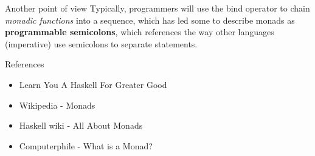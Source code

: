 \documentclass{beamer}
\begin{document}
\begin{frame}[fragile]{Another point of view}
    Typically, programmers will use the bind operator to chain
    \textit{monadic functions} into a sequence, which has led
    some to describe monads as \textbf{programmable semicolons},
    which references the way other languages (imperative) use
    semicolons to separate statements.
\end{frame}

\begin{frame}[fragile]{References}
    \begin{itemize}
        \item Learn You A Haskell For Greater Good
        \item Wikipedia - Monads
        \item Haskell wiki - All About Monads
        \item Computerphile - What is a Monad?
    \end{itemize}
\end{frame}
\end{document}
